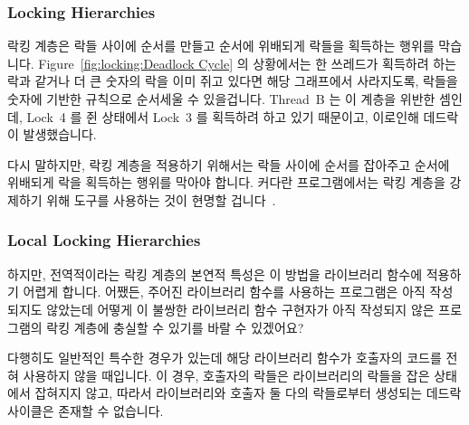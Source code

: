 \subsubsection{Locking Hierarchies}
\label{sec:locking:Locking Hierarchies}

락킹 계층은 락들 사이에 순서를 만들고 순서에 위배되게 락들을 획득하는 행위를
막습니다.
Figure~\ref{fig:locking:Deadlock Cycle} 의 상황에서는 한 쓰레드가 획득하려 하는
락과 같거나 더 큰 숫자의 락을 이미 쥐고 있다면 해당 그래프에서 사라지도록,
락들을 숫자에 기반한 규칙으로 순서세울 수 있을겁니다.
Thread~B 는 이 계층을 위반한 셈인데, Lock~4 를 쥔 상태에서 Lock~3 를 획득하려
하고 있기 때문이고, 이로인해 데드락이 발생했습니다.

다시 말하지만, 락킹 계층을 적용하기 위해서는 락들 사이에 순서를 잡아주고 순서에
위배되게 락을 획득하는 행위를 막아야 합니다.
커다란 프로그램에서는 락킹 계층을 강제하기 위해 도구를 사용하는 것이 현명할
겁니다~\cite{JonathanCorbet2006lockdep}.

\subsubsection{Local Locking Hierarchies}
\label{sec:locking:Local Locking Hierarchies}

하지만, 전역적이라는 락킹 계층의 본연적 특성은 이 방법을 라이브러리 함수에
적용하기 어렵게 합니다.
어쨌든, 주어진 라이브러리 함수를 사용하는 프로그램은 아직 작성되지도 않았는데
어떻게 이 불쌍한 라이브러리 함수 구현자가 아직 작성되지 않은 프로그램의 락킹
계층에 충실할 수 있기를 바랄 수 있겠어요?

다행히도 일반적인 특수한 경우가 있는데 해당 라이브러리 함수가 호출자의 코드를
전혀 사용하지 않을 때입니다.
이 경우, 호출자의 락들은 라이브러리의 락들을 잡은 상태에서 잡혀지지 않고,
따라서 라이브러리와 호출자 둘 다의 락들로부터 생성되는 데드락 사이클은 존재할
수 없습니다.
\iffalse

